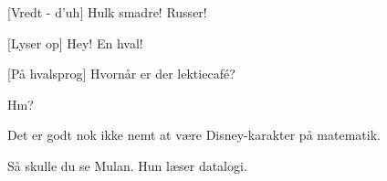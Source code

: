 \documentclass[a4paper,11pt]{article}
\begin{document}
\begin{sketch}

[Vredt - d'uh] Hulk smadre! Russer!

[Lyser op] Hey! En hval!

[På hvalsprog] Hvornår er der lektiecafé?


 Hm?

 Det er godt nok ikke nemt at være Disney-karakter på matematik.

 Så skulle du se Mulan. Hun læser datalogi.

\end{sketch}
\end{document}
